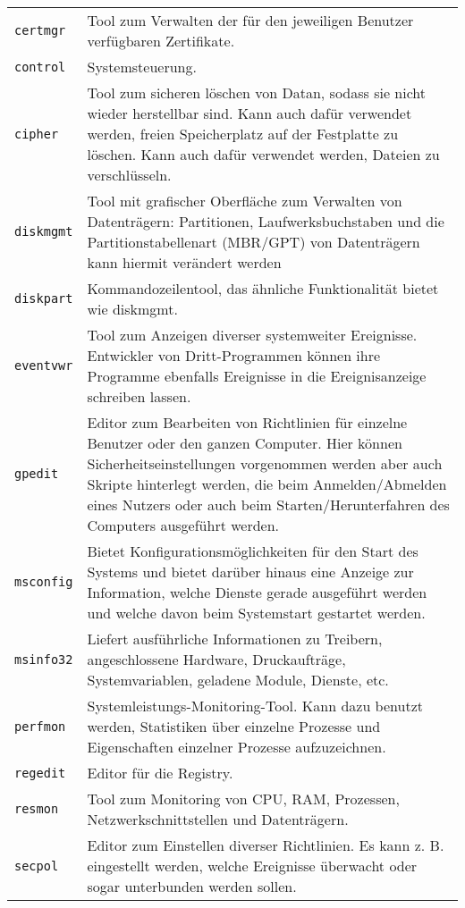 \begin{multicols}{3}
\begin{tabular}{@{}p{\the\MyLen}
		@{}p{\linewidth-\the\MyLen}@{}}
	\texttt{certmgr} &  Tool zum Verwalten der für den jeweiligen Benutzer verfügbaren Zertifikate.\\
    \texttt{control} &  Systemsteuerung.\\
    \texttt{cipher} &  Tool zum sicheren löschen von Datan, sodass sie nicht wieder herstellbar sind. Kann auch dafür verwendet werden, freien Speicherplatz auf der Festplatte zu löschen. Kann auch dafür verwendet werden, Dateien zu verschlüsseln.\\
	\texttt{diskmgmt} &  Tool mit grafischer Oberfläche zum Verwalten von Datenträgern: Partitionen, Laufwerksbuchstaben und die Partitionstabellenart (MBR/GPT) von Datenträgern kann hiermit verändert werden\\
	\texttt{diskpart} &  Kommandozeilentool, das ähnliche Funktionalität bietet wie diskmgmt.\\
	\texttt{eventvwr} & Tool zum Anzeigen diverser systemweiter Ereignisse. Entwickler von Dritt-Programmen können ihre Programme ebenfalls Ereignisse in die Ereignisanzeige schreiben lassen.\\
	\texttt{gpedit} & Editor zum Bearbeiten von Richtlinien für einzelne Benutzer oder den ganzen Computer. Hier können Sicherheitseinstellungen vorgenommen werden aber auch Skripte hinterlegt werden, die beim Anmelden/Abmelden eines Nutzers oder auch beim Starten/Herunterfahren des Computers ausgeführt werden.\\
	\texttt{msconfig} & Bietet Konfigurationsmöglichkeiten für den Start des Systems und bietet darüber hinaus eine Anzeige zur Information, welche Dienste gerade ausgeführt werden und welche davon beim Systemstart gestartet werden.\\
	\texttt{msinfo32} & Liefert ausführliche Informationen zu Treibern, angeschlossene Hardware, Druckaufträge, Systemvariablen, geladene Module, Dienste, etc.\\
	\texttt{perfmon} & Systemleistungs-Monitoring-Tool. Kann dazu benutzt werden, Statistiken über einzelne Prozesse und Eigenschaften einzelner Prozesse aufzuzeichnen.\\
	\texttt{regedit} & Editor für die Registry.\\
	\texttt{resmon} & Tool zum Monitoring von CPU, RAM, Prozessen, Netzwerkschnittstellen und Datenträgern.\\
	\texttt{secpol} & Editor zum Einstellen diverser Richtlinien. Es kann z. B. eingestellt werden, welche Ereignisse überwacht oder sogar unterbunden werden sollen.\\

\end{tabular}
\end{multicols}
